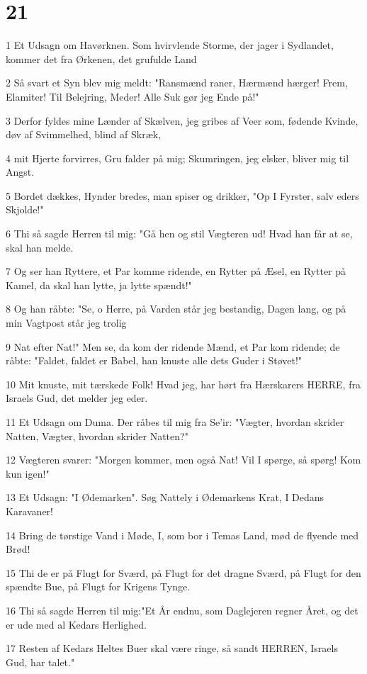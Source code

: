 \chapter{21}

\par 1 Et Udsagn om Havørknen. Som hvirvlende Storme, der jager i Sydlandet, kommer det fra Ørkenen, det grufulde Land
\par 2 Så svart et Syn blev mig meldt: "Ransmænd raner, Hærmænd hærger! Frem, Elamiter! Til Belejring, Meder! Alle Suk gør jeg Ende på!"
\par 3 Derfor fyldes mine Lænder af Skælven, jeg gribes af Veer som, fødende Kvinde, døv af Svimmelhed, blind af Skræk,
\par 4 mit Hjerte forvirres, Gru falder på mig; Skumringen, jeg elsker, bliver mig til Angst.
\par 5 Bordet dækkes, Hynder bredes, man spiser og drikker, "Op I Fyrster, salv eders Skjolde!"
\par 6 Thi så sagde Herren til mig: "Gå hen og stil Vægteren ud! Hvad han får at se, skal han melde.
\par 7 Og ser han Ryttere, et Par komme ridende, en Rytter på Æsel, en Rytter på Kamel, da skal han lytte, ja lytte spændt!"
\par 8 Og han råbte: "Se, o Herre, på Varden står jeg bestandig, Dagen lang, og på min Vagtpost står jeg trolig
\par 9 Nat efter Nat!" Men se, da kom der ridende Mænd, et Par kom ridende; de råbte: "Faldet, faldet er Babel, han knuste alle dets Guder i Støvet!"
\par 10 Mit knuste, mit tærskede Folk! Hvad jeg, har hørt fra Hærskarers HERRE, fra Israels Gud, det melder jeg eder.
\par 11 Et Udsagn om Duma. Der råbes til mig fra Se'ir: "Vægter, hvordan skrider Natten, Vægter, hvordan skrider Natten?"
\par 12 Vægteren svarer: "Morgen kommer, men også Nat! Vil I spørge, så spørg! Kom kun igen!"
\par 13 Et Udsagn: "I Ødemarken". Søg Nattely i Ødemarkens Krat, I Dedans Karavaner!
\par 14 Bring de tørstige Vand i Møde, I, som bor i Temas Land, mød de flyende med Brød!
\par 15 Thi de er på Flugt for Sværd, på Flugt for det dragne Sværd, på Flugt for den spændte Bue, på Flugt for Krigens Tynge.
\par 16 Thi så sagde Herren til mig:"Et År endnu, som Daglejeren regner Året, og det er ude med al Kedars Herlighed.
\par 17 Resten af Kedars Heltes Buer skal være ringe, så sandt HERREN, Israels Gud, har talet."

